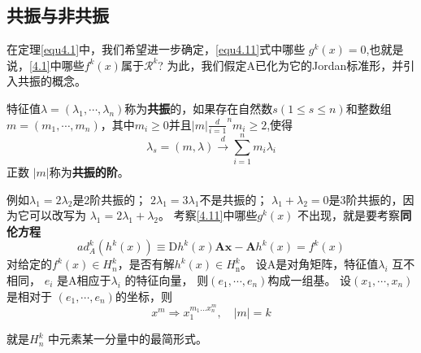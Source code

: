 \subsection{共振与非共振}
在定理\ref{equ4.1}中，我们希望进一步确定，\ref{equ4.11}式中哪些
\(g^k(x)=0\),也就是说，\ref{4.1}中哪些\(f^k(x)\)属于\(\mathscr{R}^k\)?
为此，我们假定A已化为它的Jordan标准形，并引入共振的概念。

\begin{defination}
  特征值$\lambda = \left( \lambda _ { 1 } , \cdots , \lambda _ { n } \right)$称为\textbf{共振}的，如果存在自然数$s ( 1 \leqslant s \leqslant n )$和整数组$m = \left( m _ { 1 } , \cdots , m _ { n } \right)$，其中$m _ { i } \geqslant 0$并且$| m |$$\frac { d } { i = 1 } ^ { n } m _ { i } \geq 2$,使得
  \begin{equation}
\lambda_{ s } = ( m , \lambda ) \stackrel { d } { \longrightarrow } \sum _ { i = 1 } ^ { n } m _ { i } \lambda _ { i }
    \label{eq:1.4.14}
  \end{equation}
  正数 \(|m|\)称为\textbf{共振的阶}。
  \label{def1.4.11}
\end{defination}
例如$\lambda _ { 1 } = 2 \lambda _ { 2 }$是2阶共振的；
$2 \lambda _ { 1 } = 3 \lambda _ { 1 }$不是共振的；
$\lambda _ { 1 } + \lambda _ { 2 } =0$是3阶共振的，因为它可以改写为
$\lambda _ { 1 } = 2 \lambda _ { 1 } + \lambda _ { 2 }$。
考察\ref{4.11}中哪些\(g^k(x)\) 不出现，就是要考察\textbf{同伦方程}
\begin{equation}
  a d _ { A } ^ { k } \left( h ^ { k } ( x ) \right)
  \equiv
  \mathrm { D } h ^ { k } ( x ) \boldsymbol { A } \boldsymbol { x } - \boldsymbol { A } h ^ { k } ( x ) = f ^ { k } ( x )
  \label{eq:1.4.15}
\end{equation}
对给定的$f ^ { k } ( x ) \in H _ { n } ^ { k }$，是否有解$h ^ { k } ( x ) \in H _ { \mathrm { n } } ^ { k }$。
设A是对角矩阵，特征值\(\lambda_i\) 互不相同，
\(e_i\) 是A相应于\(\lambda_i\) 的特征向量，
则$\left( e _ { 1 } , \cdots , e _ { n } \right)$构成一组基。
设$\left( x _ { 1 } , \cdots , x _ { n } \right)$是相对于
$\left( e _ { 1 } , \cdots , e _ { n } \right)$的坐标，则
\begin{equation}
  x ^ { m } \Longrightarrow x _ { 1 } ^ { m _ { 1 } \ldots x _ { n } ^ { m } } , \quad | m | = k
\end{equation}

就是\(H_n^k\) 中元素某一分量中的最简形式。


